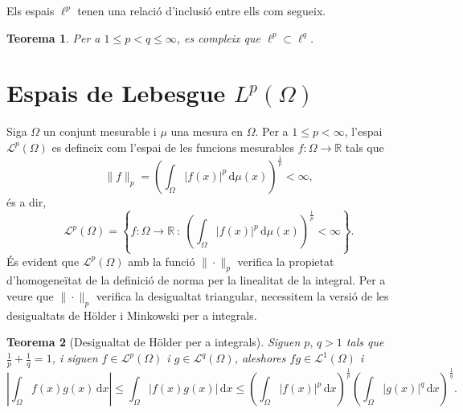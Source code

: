 \documentclass[12pt]{book}
\newtheorem{teorema}{Teorema}[chapter]
\theoremstyle{definition}
\theoremstyle{nota}
\theoremstyle{exemple}
\begin{document}
Els espais $\ell^p$ tenen una relació d'inclusió entre ells com
segueix.

\begin{teorema}
  Per a $1 \leq p < q \leq \infty$, es compleix que
  $\ell^p \subset \ell^q$.
\end{teorema}

\section{Espais de Lebesgue \texorpdfstring{$L^p(\Omega)$}{Lp}}

Siga $\Omega$ un conjunt mesurable i $\mu$ una mesura en $\Omega$. Per
a $1 \leq p < \infty$, l'espai $\mathcal{L}^p(\Omega)$ es defineix com
l'espai de les funcions mesurables $f : \Omega \to \mathbb{R}$ tals
que
\[
  \|f\|_p = \left( \int_\Omega |f(x)|^p \, \mathrm{d}\mu(x)
  \right)^{\frac{1}{p}} < \infty,
\]
és a dir,
\[
  \mathcal{L}^p(\Omega) = \left\{ f : \Omega \to \mathbb{R}\ :\ \left(
      \int_\Omega |f(x)|^p \, \mathrm{d}\mu(x) \right)^{\frac{1}{p}} <
    \infty \right\}.
\]
És evident que $\mathcal{L}^p(\Omega)$ amb la funció $\|\cdot\|_p$
verifica la propietat d'homogeneïtat de la definició de norma per la
linealitat de la integral. Per a veure que $\|\cdot\|_p$ verifica la
desigualtat triangular, necessitem la versió de les desigualtats de
Hölder i Minkowski per a integrals.

\begin{teorema}[Desigualtat de Hölder per a integrals]
  Siguen $p,\,q>1$ tals que $\frac{1}{p} + \frac{1}{q} = 1$, i siguen
  $f \in \mathcal{L}^p(\Omega)$ i $g \in \mathcal{L}^q(\Omega)$,
  aleshores $fg \in \mathcal{L}^1(\Omega)$ i
  \[
    \left| \int_\Omega f(x)g(x)\, \mathrm{d}x \right| \leq
    \int_\Omega |f(x)g(x)|\,\mathrm{d}x \leq
    \left(\int_\Omega |f(x)|^p\,\mathrm{d}x\right)^{\frac{1}{p}}
    \left(\int_\Omega |g(x)|^q\,\mathrm{d}x\right)^{\frac{1}{q}}.
  \]
\end{teorema}
\end{document}
